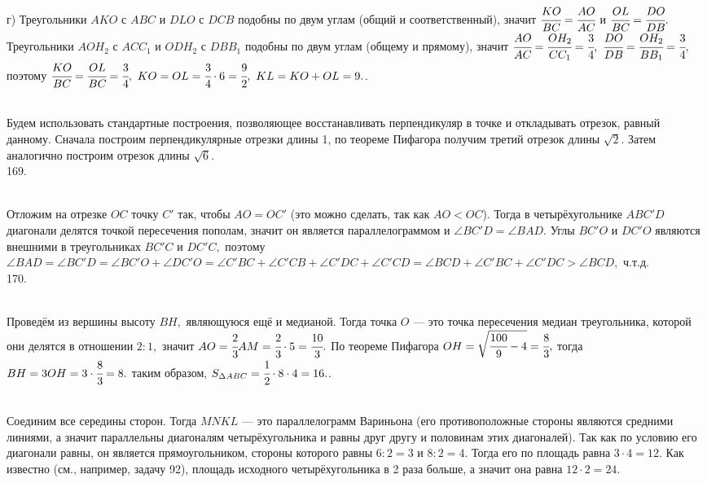 г) Треугольники $AKO$ с $ABC$ и $DLO$ с $DCB$ подобны по двум углам (общий и соответственный), значит $\cfrac{KO}{BC}=\cfrac{AO}{AC}$ и $\cfrac{OL}{BC}=\cfrac{DO}{DB}.$ Треугольники $AOH_2$ с $ACC_1$ и $ODH_2$ с $DBB_1$ подобны по двум углам (общему и прямому), значит $\cfrac{AO}{AC}=\cfrac{OH_2}{CC_1}=\cfrac{3}{4},\ \cfrac{DO}{DB}=\cfrac{OH_2}{BB_1}=\cfrac{3}{4},$ поэтому $\cfrac{KO}{BC}=\cfrac{OL}{BC}=\cfrac{3}{4},\
KO=OL=\cfrac{3}{4}\cdot6=\cfrac{9}{2},\ KL=KO+OL=9.$\newpage\noindent
168. \begin{figure}[ht!]
\end{figure}\\
Будем использовать стандартные построения, позволяющее восстанавливать перпендикуляр в точке и откладывать отрезок, равный данному. Сначала построим перпендикулярные отрезки длины 1, по теореме Пифагора получим третий отрезок длины $\sqrt{2}.$ Затем аналогично построим отрезок длины $\sqrt{6}.$\\
169. \begin{figure}[ht!]
\end{figure}\\
Отложим на отрезке $OC$ точку $C'$ так, чтобы $AO=OC'$ (это можно сделать, так как $AO<OC$). Тогда в четырёхугольнике $ABC'D$ диагонали делятся точкой пересечения пополам, значит он является параллелограммом и $\angle BC'D=\angle BAD.$ Углы $BC'O$ и $DC'O$ являются внешними в треугольниках $BC'C$ и $DC'C,$ поэтому $\angle BAD=\angle BC'D=\angle BC'O+\angle DC'O=\angle C'BC+\angle C'CB+\angle C'DC+\angle C'CD=\angle BCD+\angle C'BC+\angle C'DC>\angle BCD,$ ч.т.д.\\
170. \begin{figure}[ht!]
\end{figure}\\
Проведём из вершины высоту $BH,$ являющуюся ещё и медианой. Тогда точка $O$ --- это точка пересечения медиан треугольника, которой они делятся в отношении $2:1,$ значит $AO=\cfrac{2}{3}AM=\cfrac{2}{3}\cdot5=\cfrac{10}{3}.$ По теореме Пифагора $OH=\sqrt{\cfrac{100}{9}-4}=\cfrac{8}{3},$ тогда $BH=3OH=3\cdot\cfrac{8}{3}=8.$ таким образом, $S_{\Delta ABC}=\cfrac{1}{2}\cdot8\cdot4=16.$\newpage\noindent
171. \begin{figure}[ht!]
\end{figure}\\
Соединим все середины сторон. Тогда $MNKL$ --- это параллелограмм Вариньона (его противоположные стороны являются средними линиями, а значит параллельны диагоналям четырёхугольника и равны друг другу и половинам этих диагоналей). Так как по условию его диагонали равны, он является прямоугольником, стороны которого равны $6:2=3$ и $8:2=4.$ Тогда его по площадь равна $3\cdot4=12.$ Как известно (см., например, задачу 92), площадь исходного четырёхугольника в 2 раза больше, а значит она равна $12\cdot2=24.$\\
